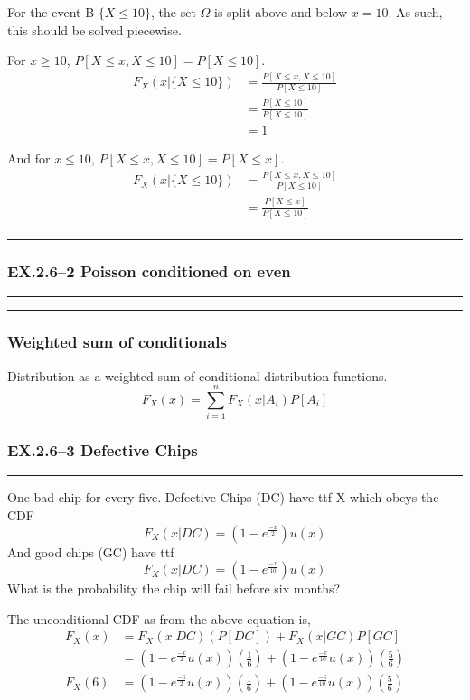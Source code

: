 \documentclass[a4paper]{article}
\begin{document}
For the event B $\{X\leq 10\}$, the set $\Omega$ is split above and below $x=10$. As such, this should be solved piecewise.

For $x\geq 10$, $P[X\leq x, X \leq 10]=P[X\leq 10]$.
\begin{align*}
F_X(x|\{X \leq 10\})&= \frac{P[X\leq x, X \leq 10]}{P[X\leq 10]}\\
&= \frac{P[X \leq 10]}{P[X\leq 10]}\\
&= 1
\end{align*}

And for $x\leq 10$, $P[X\leq x, X \leq 10]=P[X\leq x]$.
\begin{align*}
F_X(x|\{X \leq 10\})&= \frac{P[X\leq x, X \leq 10]}{P[X\leq 10]}\\
&= \frac{P[X \leq x]}{P[X\leq 10]}\\
\end{align*}
\hrule

\subsubsection*{EX.\@ 2.6--2 Poisson conditioned on even}\label{ssub:poisson_conditioned_on_even}
\hrule\vspace{2mm}

\hrule\vspace{2mm}


\subsubsection*{Weighted sum of conditionals}\label{ssub:poisson_conditioned_on_even}
Distribution as a weighted sum of conditional distribution functions.
$$F_X(x)=\sum_{i=1}^{n}F_X(x|A_i)P[A_i]$$

\subsubsection*{EX.\@ 2.6--3 Defective Chips}\label{ssub:poisson_conditioned_on_even}
\hrule\vspace{2mm}
One bad chip for every five. Defective Chips (DC) have ttf X which obeys the CDF
$$F_X(x|DC)=(1-e^{\frac{-x}{2}})u(x)$$
And good chips (GC) have ttf
$$F_X(x|DC)=(1-e^{\frac{-x}{10}})u(x)$$
What is the probability the chip will fail before six months?

The unconditional CDF as from the above equation is,
\begin{align*}
F_X(x)&=F_X(x|DC)(P[DC]) + F_X(x|GC)P[GC]\\
&= (1-e^{\frac{-x}{2}}u(x))\left(\frac{1}{6} \right) + (1-e^{\frac{-x}{10}}u(x))\left(\frac{5}{6}  \right)\\
F_X(6)&= (1-e^{\frac{-6}{2}}u(x))\left(\frac{1}{6} \right) + (1-e^{\frac{-6}{10}}u(x))\left(\frac{5}{6}  \right)\\
\end{align*}
\end{document}
